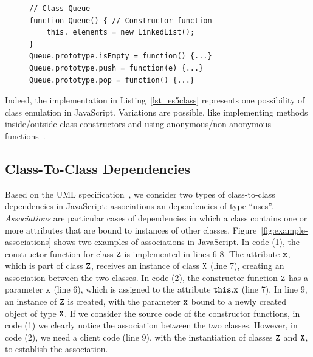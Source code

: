 \documentclass[review]{elsarticle}
\newcommand{\aspas}[1]{{``#1''}}
\newcommand{\mcode}[1]{$\tt #1$}
\begin{document}
\begin{figure}[htbp]
	\begin{lstlisting}[caption=Class emulation in legacy JavaScript code, label=lst_es5class]
// Class Queue
function Queue() { // Constructor function
	this._elements = new LinkedList();
}
Queue.prototype.isEmpty = function() {...}
Queue.prototype.push = function(e) {...}
Queue.prototype.pop = function() {...}
	\end{lstlisting}
\end{figure}

Indeed, the implementation in Listing~\ref{lst_es5class} represents one possibility of class emulation in JavaScript. Variations are possible, like implementing methods inside/outside class constructors and using anonymous/non-anonymous functions~\cite{silva-saner2015, gama:2012}.


\subsection{Class-To-Class Dependencies}
\label{subsec:dependencies}

Based on the UML specification~\cite{Fowler2003}, we consider two types of class-to-class dependencies in JavaScript: associations an dependencies of type \aspas{uses}. \textit{Associations} are particular cases of dependencies in which a class contains one or more attributes that are bound to instances of other classes. Figure~\ref{fig:example-associations} shows two examples of associations in JavaScript. In code (1), the constructor function for class \mcode{Z} is implemented in lines 6-8. The attribute \mcode{x}, which is part of class \mcode{Z}, receives an instance of class \mcode{X} (line 7), creating an association between the two classes. In code (2), the constructor function \mcode{Z} has a parameter \mcode{x} (line 6), which is assigned to the attribute \mcode{this.x} (line 7). In line 9, an instance of \mcode{Z} is created, with the parameter \mcode{x} bound to a newly created object of type \mcode{X}. If we consider the source code of the constructor functions, in code (1) we clearly notice the association between the two classes. However, in code (2), we need a client code (line 9), with the instantiation of classes \mcode{Z} and \mcode{X}, to establish the association.
\end{document}
